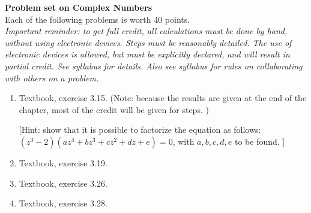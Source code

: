 \documentclass{article}
\begin{document}
{\bf Problem set on Complex Numbers }\\

Each of the following problems is worth 40 points. \\

\emph{Important reminder: to get full credit, all calculations must be done by hand, without using electronic devices. Steps must be reasonably detailed.  The use of electronic devices is allowed, but must be explicitly declared, and will result in partial credit. See syllabus for details. Also see syllabus for rules on collaborating with others on a problem.   }  

\begin{enumerate}


\item  Textbook, exercise 3.15. (Note: because the results are given at the end of the chapter, most of the  credit will be given for steps. ) 

[Hint:  show that it is possible to factorize the equation as follows: $(z^3-2)(a z^4 + b z^3 + c z^2 + d z + e)=0$, with $a,b,c,d,e$ to be found. ]

\item  Textbook, exercise 3.19.

\item  Textbook, exercise 3.26.

\item  Textbook, exercise 3.28. 

\end{enumerate}
\end{document}
